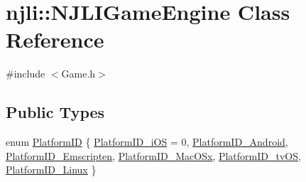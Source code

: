 \hypertarget{classnjli_1_1_n_j_l_i_game_engine}{}\section{njli\+:\+:N\+J\+L\+I\+Game\+Engine Class Reference}
\label{classnjli_1_1_n_j_l_i_game_engine}


{\ttfamily \#include $<$Game.\+h$>$}

\subsection*{Public Types}
\begin{DoxyCompactItemize}
\item 
enum \mbox{\hyperlink{classnjli_1_1_n_j_l_i_game_engine_a5a2bbb7c337d3918056ba12307f2a4ed}{Platform\+ID}} \{ \newline
\mbox{\hyperlink{classnjli_1_1_n_j_l_i_game_engine_a5a2bbb7c337d3918056ba12307f2a4eda6cf2daab29241b0e763ff97c8f4f53e7}{Platform\+I\+D\+\_\+i\+OS}} = 0, 
\mbox{\hyperlink{classnjli_1_1_n_j_l_i_game_engine_a5a2bbb7c337d3918056ba12307f2a4eda6c558271f40073f76d00143d7cb6ff8e}{Platform\+I\+D\+\_\+\+Android}}, 
\mbox{\hyperlink{classnjli_1_1_n_j_l_i_game_engine_a5a2bbb7c337d3918056ba12307f2a4eda4aea7a4dcf787eccd5eeb27f18a4353f}{Platform\+I\+D\+\_\+\+Emscripten}}, 
\mbox{\hyperlink{classnjli_1_1_n_j_l_i_game_engine_a5a2bbb7c337d3918056ba12307f2a4eda0957148df4fb1940266bf4153d5cfa48}{Platform\+I\+D\+\_\+\+Mac\+O\+Sx}}, 
\newline
\mbox{\hyperlink{classnjli_1_1_n_j_l_i_game_engine_a5a2bbb7c337d3918056ba12307f2a4eda9e5108023740f93fa7a49845aa0d72dc}{Platform\+I\+D\+\_\+tv\+OS}}, 
\mbox{\hyperlink{classnjli_1_1_n_j_l_i_game_engine_a5a2bbb7c337d3918056ba12307f2a4edaaa85a957f94a226990385d06106eee62}{Platform\+I\+D\+\_\+\+Linux}}
 \}
\end{DoxyCompactItemize}

